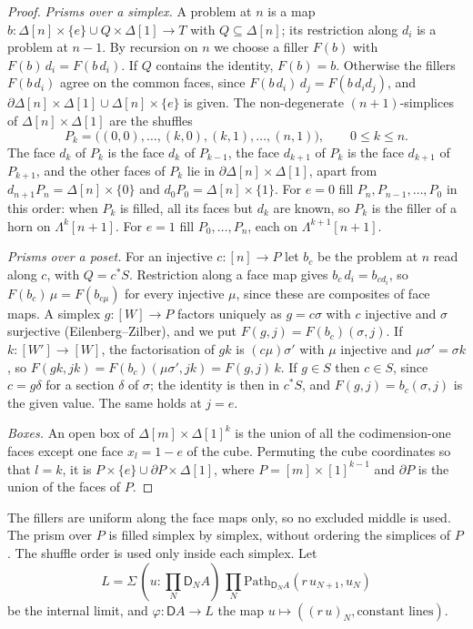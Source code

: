 \documentclass[11pt]{article}
\newcommand{\Path}{\mathrm{Path}}
\newcommand{\D}{\mathsf{D}}
\newcommand{\Lam}{\Lambda}
\theoremstyle{plain}
\theoremstyle{definition}
\theoremstyle{remark}
\begin{document}
\begin{proof}
\emph{Prisms over a simplex.} A problem at $n$ is a map
$b:\Delta[n]\times\{e\}\cup Q\times\Delta[1]\to T$ with $Q\subseteq\Delta[n]$; its
restriction along $d_i$ is a problem at $n-1$. By recursion on $n$ we choose a
filler $F(b)$ with $F(b)\,d_i=F(b\,d_i)$. If $Q$ contains the identity,
$F(b)=b$. Otherwise the fillers $F(b\,d_i)$ agree on the common faces, since
$F(b\,d_i)\,d_j=F(b\,d_id_j)$, and $\partial\Delta[n]\times\Delta[1]\cup
\Delta[n]\times\{e\}$ is given. The non-degenerate $(n+1)$-simplices of
$\Delta[n]\times\Delta[1]$ are the shuffles
\[
P_k=\bigl((0,0),\dots,(k,0),(k,1),\dots,(n,1)\bigr),\qquad 0\le k\le n.
\]
The face $d_k$ of $P_k$ is the face $d_k$ of $P_{k-1}$, the face $d_{k+1}$ of
$P_k$ is the face $d_{k+1}$ of $P_{k+1}$, and the other faces of $P_k$ lie in
$\partial\Delta[n]\times\Delta[1]$, apart from $d_{n+1}P_n=\Delta[n]\times\{0\}$
and $d_0P_0=\Delta[n]\times\{1\}$. For $e=0$ fill $P_n,P_{n-1},\dots,P_0$ in
this order: when $P_k$ is filled, all its faces but $d_k$ are known, so $P_k$
is the filler of a horn on $\Lam^k[n+1]$. For $e=1$ fill $P_0,\dots,P_n$, each
on $\Lam^{k+1}[n+1]$.

\emph{Prisms over a poset.} For an injective $c:[n]\to P$ let $b_c$ be the
problem at $n$ read along $c$, with $Q=c^*S$. Restriction along a face map
gives $b_c\,d_i=b_{cd_i}$, so $F(b_c)\,\mu=F(b_{c\mu})$ for every injective
$\mu$, since these are composites of face maps. A simplex $g:[W]\to P$ factors uniquely as
$g=c\sigma$ with $c$ injective and $\sigma$ surjective (Eilenberg--Zilber), and
we put $F(g,j)=F(b_c)(\sigma,j)$. If $k:[W']\to[W]$, the factorisation of
$gk$ is $(c\mu)\sigma'$ with $\mu$ injective and $\mu\sigma'=\sigma k$, so
$F(gk,jk)=F(b_c)(\mu\sigma',jk)=F(g,j)\,k$. If $g\in S$ then $c\in S$, since
$c=g\delta$ for a section $\delta$ of $\sigma$; the identity is then in
$c^*S$, and $F(g,j)=b_c(\sigma,j)$ is the given value. The same holds at
$j=e$.

\emph{Boxes.} An open box of $\Delta[m]\times\Delta[1]^k$ is the union of all the
codimension-one faces except one face $x_l=1-e$ of the cube. Permuting the cube
coordinates so that $l=k$, it is $P\times\{e\}\cup\partial P\times\Delta[1]$,
where $P=[m]\times[1]^{k-1}$ and $\partial P$ is the union of the faces of $P$.
\end{proof}

The fillers are uniform along the face maps only, so no excluded middle is
used. The prism over $P$ is filled simplex by simplex, without ordering
the simplices of $P$. The shuffle order is used only inside each simplex.
Let
\[
L=\Sigma\,(u:\textstyle\prod_N\D_NA)\,\prod_N\Path_{\D_NA}(r\,u_{N+1},u_N)
\]
be the internal limit, and $\varphi:\D A\to L$ the map
$u\mapsto((r\,u)_N,\text{constant lines})$.
\end{document}
